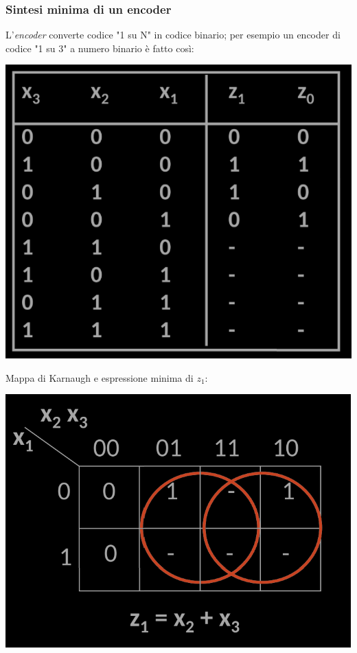 \documentclass{article}
\begin{document}
\subsubsection{Sintesi minima di un encoder}
L'\textit{encoder} converte codice "1 su N" in codice binario; per esempio un encoder di codice "1 su 3" a numero binario è fatto così:
\begin{center}
    \includegraphics[scale=0.52]{encoder3.png}
\end{center}
Mappa di Karnaugh e espressione minima di $z_1$:
\begin{center}
    \includegraphics[scale=0.55]{Z1.png}
\end{center}
\end{document}
